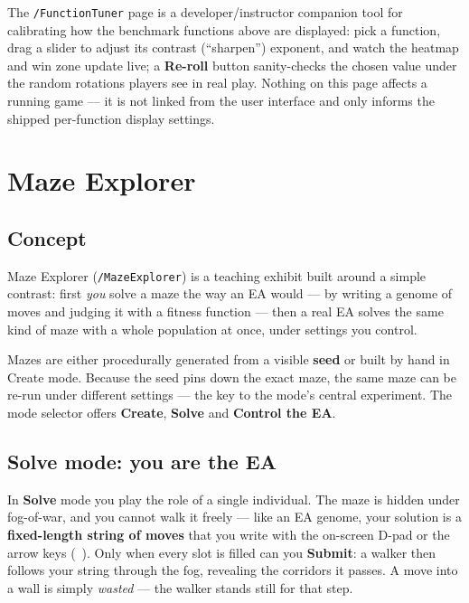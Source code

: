 \documentclass[11pt,a4paper]{report}
\newcommand{\route}[1]{\texttt{#1}}          %
\newcommand{\uielem}[1]{\textsf{\textbf{#1}}} %
\newcommand{\key}[1]{\fbox{\small\texttt{#1}}} %
\begin{document}
The \route{/FunctionTuner} page is a developer/instructor companion tool
for calibrating how the benchmark functions above are displayed: pick a
function, drag a slider to adjust its contrast (``sharpen'') exponent, and
watch the heatmap and win zone update live; a \uielem{Re-roll} button
sanity-checks the chosen value under the random rotations players see in
real play. Nothing on this page affects a running game --- it is not linked
from the user interface and only informs the shipped per-function display
settings.

\chapter{Maze Explorer}
\label{ch:maze}

\section{Concept}

Maze Explorer (\route{/MazeExplorer}) is a teaching exhibit built around a
simple contrast: first \emph{you} solve a maze the way an EA would --- by
writing a genome of moves and judging it with a fitness function --- then a
real EA solves the same kind of maze with a whole population at once, under
settings you control.

Mazes are either procedurally generated from a visible \textbf{seed} or
built by hand in Create mode. Because the seed pins down the exact maze, the
same maze can be re-run under different settings --- the key to the mode's
central experiment. The mode selector offers \uielem{Create},
\uielem{Solve} and \uielem{Control the EA}.

\section{Solve mode: you are the EA}

In \uielem{Solve} mode you play the role of a single individual. The maze is
hidden under fog-of-war, and you cannot walk it freely --- like an EA
genome, your solution is a \textbf{fixed-length string of moves} that you
write with the on-screen D-pad or the arrow keys
(\key{$\uparrow$}\,\key{$\downarrow$}\,\key{$\leftarrow$}\,\key{$\rightarrow$}).
Only when every slot is filled can you \uielem{Submit}: a walker then
follows your string through the fog, revealing the corridors it passes. A
move into a wall is simply \emph{wasted} --- the walker stands still for
that step.
\end{document}
